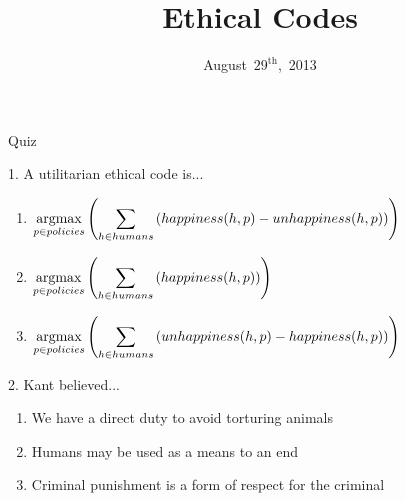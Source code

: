\documentclass{beamer}
\title[Ethical Codes]{Ethical Codes}
\date{August~$29^{\text{th}}$,~2013}
\begin{document}
\begin{frame}
\titlepage
\end{frame}

\begin{frame}{Quiz}

\begin{block}{1. A utilitarian ethical code is...}
\begin{enumerate}[label=(\Alph*)]
\item $\displaystyle \operatorname*{argmax}_{p \in policies} \left( \sum_{h \in humans} \left( happiness(h, p) - unhappiness(h, p)\right)\right)$
\item $\displaystyle \operatorname*{argmax}_{p \in policies} \left( \sum_{h \in humans} \left( happiness(h, p)\right)\right)$
\item $\displaystyle \operatorname*{argmax}_{p \in policies} \left( \sum_{h \in humans} \left( unhappiness(h, p) - happiness(h, p)\right)\right)$
\end{enumerate}
\end{block}

\begin{block}{2. Kant believed...}
\begin{enumerate}[label=(\Alph*)]
\item We have a direct duty to avoid torturing animals
\item Humans may be used as a means to an end
\item Criminal punishment is a form of respect for the criminal
\end{enumerate}
\end{block}

\end{frame}
\end{document}
